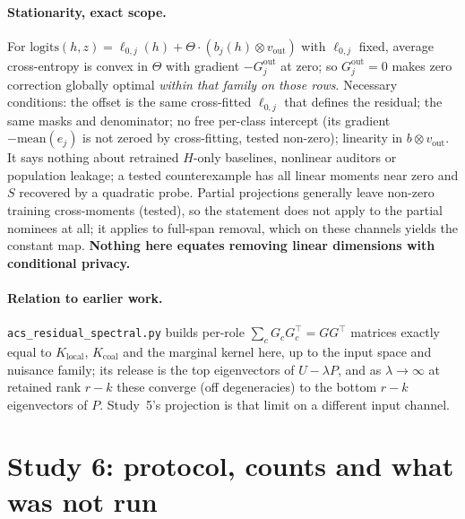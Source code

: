 \documentclass[10pt]{article}
\begin{document}
\paragraph{Stationarity, exact scope.} For $\mathrm{logits}(h,z)=\ell_{0,j}(h)+\Theta\cdot(b_j(h)\otimes v_{\mathrm{out}})$
with $\ell_{0,j}$ fixed, average cross-entropy is convex in $\Theta$ with gradient $-G_j^{\mathrm{out}}$ at zero; so
$G_j^{\mathrm{out}}=0$ makes zero correction globally optimal \emph{within that family on those rows}. Necessary
conditions: the offset is the same cross-fitted $\ell_{0,j}$ that defines the residual; the same masks and
denominator; no free per-class intercept (its gradient $-\mathrm{mean}(e_j)$ is not zeroed by cross-fitting, tested
non-zero); linearity in $b\otimes v_{\mathrm{out}}$. It says nothing about retrained $H$-only baselines, nonlinear
auditors or population leakage; a tested counterexample has all linear moments near zero and $S$ recovered by a
quadratic probe. Partial projections generally leave non-zero training cross-moments (tested), so the statement
does not apply to the partial nominees at all; it applies to full-span removal, which on these channels yields the
constant map. \textbf{Nothing here
equates removing linear dimensions with conditional privacy.}
\paragraph{Relation to earlier work.} \texttt{acs\_residual\_spectral.py} builds per-role
$\sum_cG_cG_c^\top=GG^\top$ matrices exactly equal to $K_{\mathrm{local}}$, $K_{\mathrm{coal}}$ and the marginal
kernel here, up to the input space and nuisance family; its release is the top eigenvectors of $U-\lambda P$, and
as $\lambda\to\infty$ at retained rank $r-k$ these converge (off degeneracies) to the bottom $r-k$ eigenvectors of
$P$. Study~5's projection is that limit on a different input channel.

\begin{table}[H]
\centering\scriptsize

\caption{Every load-bearing claim, its status, the measurement behind it, and what it does not establish.
The traceable list---source commit, artifact, key, pool and uncertainty procedure---is
\texttt{CLAIM\_LEDGER.csv}.}
\label{tab:claimsupport}
\end{table}
\section{Study 6: protocol, counts and what was not run}
\label{app:study6}
\begin{table}[H]
\centering\footnotesize

\caption{Study~6 ran as a preregistered tier ladder with machine-readable gates. \textbf{Tiers 3 and 4 were
never triggered}: the pilot gate failed and the protocol forbids opening a larger grid afterwards. They are
absent evidence for an unrun design, not missing evidence for a claimed one; no partial Tier-3 grid was
fitted. The pilot's 42 units are the first 42 of the 135-slot cumulative plan.}
\label{tab:s6tiers}
\end{table}
\end{document}
